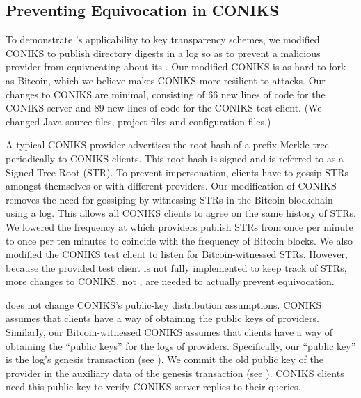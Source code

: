 \subsection{Preventing Equivocation in CONIKS}
\label{sec:prototype:coniks}

\newcommand{\numlinessv}{66\xspace}
\newcommand{\numlinescl}{89\xspace}

To demonstrate \Sys's applicability to key transparency schemes, we modified CONIKS\cite{coniks} to publish directory digests in a \Sys log so as to prevent a malicious provider from equivocating about its \pkd.
Our modified CONIKS is as hard to fork as Bitcoin, which we believe makes CONIKS more resilient to attacks.
Our changes to CONIKS are minimal, consisting of \numlinessv new lines of code for the CONIKS server and \numlinescl new lines of code for the CONIKS test client. (We changed Java source files, project files and configuration files.)

A typical CONIKS provider advertises the root hash of a prefix Merkle tree periodically to CONIKS clients.
This root hash is signed and is referred to as a Signed Tree Root (STR).
To prevent impersonation, clients have to gossip STRs amongst themselves or with different providers.
Our modification of CONIKS removes the need for gossiping by witnessing STRs in the Bitcoin blockchain using a \Sys log.
This allows all CONIKS clients to agree on the same history of STRs.
We lowered the frequency at which providers publish STRs from once per minute to once per ten minutes to coincide with the frequency of Bitcoin blocks.
We also modified the CONIKS test client to listen for Bitcoin-witnessed STRs.
However, because the provided test client is not fully implemented to keep track of STRs, more changes to CONIKS, not \Sys, are needed to actually prevent equivocation.

\Sys does not change CONIKS's public-key distribution assumptions.
CONIKS assumes that clients have a way of obtaining the public keys of providers.
Similarly, our Bitcoin-witnessed CONIKS assumes that clients have a way of obtaining the ``public keys'' for the \Sys logs of providers.
Specifically, our ``public key'' is the log's genesis transaction (see ).
We commit the old public key of the provider in the auxiliary data of the genesis transaction (see ).
CONIKS clients need this public key to verify CONIKS server replies to their queries.